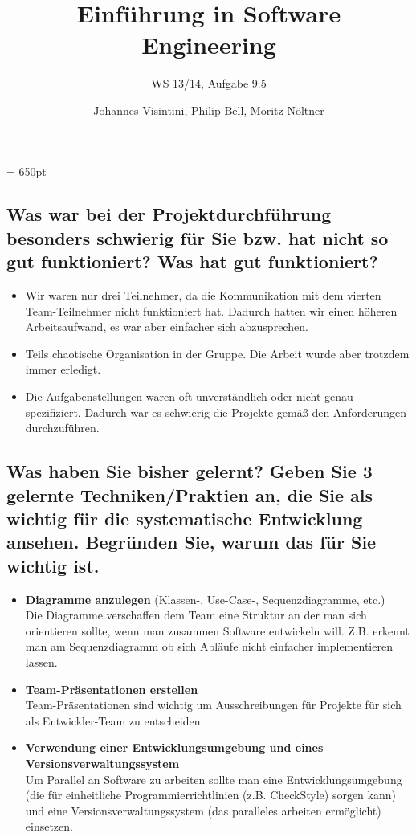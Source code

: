 \documentclass{scrartcl}
\begin{document}
\author{Johannes Visintini, Philip Bell, Moritz Nöltner}
\title{Einführung in Software Engineering}
\subtitle{WS 13/14, Aufgabe 9.5}
\maketitle

\textheight = 650pt

\subsection*{Was war bei der Projektdurchführung besonders schwierig für Sie
	bzw. hat nicht so gut funktioniert? Was hat gut funktioniert?}
\begin{itemize}
	\item Wir waren nur drei Teilnehmer, da die Kommunikation mit dem
		vierten Team-Teilnehmer nicht funktioniert hat. Dadurch hatten wir
		einen höheren Arbeitsaufwand, es war aber einfacher sich
		abzusprechen.
	\item Teils chaotische Organisation in der Gruppe. Die Arbeit wurde aber
		trotzdem immer erledigt.
	\item Die Aufgabenstellungen waren oft unverständlich oder nicht genau
		spezifiziert. Dadurch war es schwierig die Projekte gemäß den
		Anforderungen durchzuführen.
\end{itemize}

\subsection*{Was haben Sie bisher gelernt? Geben Sie 3 gelernte
	Techniken/Praktien an, die Sie als wichtig für die systematische Entwicklung
	ansehen. Begründen Sie, warum das für Sie wichtig ist.}
\begin{itemize}
	\item \textbf{Diagramme anzulegen} (Klassen-, Use-Case-, Sequenzdiagramme,
		etc.)\\
		Die Diagramme verschaffen dem Team eine Struktur an der man sich
		orientieren sollte, wenn man zusammen Software entwickeln will. Z.B.
		erkennt man am Sequenzdiagramm ob sich Abläufe nicht einfacher
		implementieren lassen.
	\item \textbf{Team-Präsentationen erstellen}\\
		Team-Präsentationen sind wichtig um Ausschreibungen für Projekte für
		sich als Entwickler-Team zu entscheiden.
	\item \textbf{Verwendung einer Entwicklungsumgebung und eines
		Versionsverwaltungssystem}\\
		Um Parallel an Software zu arbeiten sollte man eine
		Entwicklungsumgebung (die für einheitliche Programmierrichtlinien (z.B.
		CheckStyle) sorgen kann) und eine Versionsverwaltungssystem (das
		paralleles arbeiten ermöglicht) einsetzen.
\end{itemize}
\end{document}
